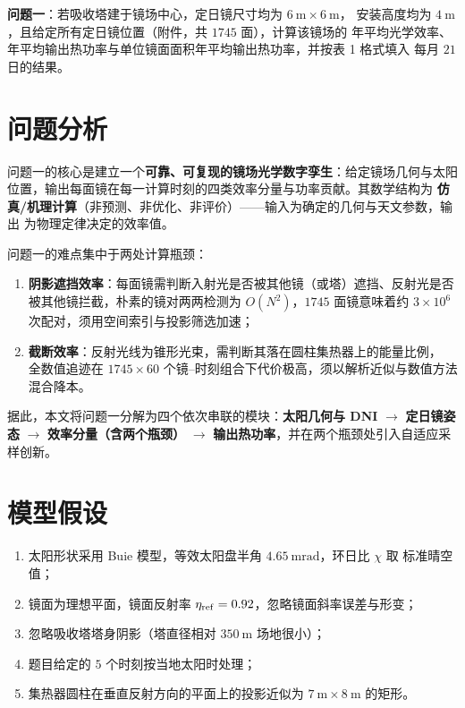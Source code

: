 \documentclass[12pt,a4paper]{ctexart}
\begin{document}
\textbf{问题一}：若吸收塔建于镜场中心，定日镜尺寸均为 $6\ \text{m}\times 6\ \text{m}$，
安装高度均为 $4\ \text{m}$，且给定所有定日镜位置（附件，共 $1745$ 面），计算该镜场的
年平均光学效率、年平均输出热功率与单位镜面面积年平均输出热功率，并按表 1 格式填入
每月 $21$ 日的结果。

\section{问题分析}
问题一的核心是建立一个\textbf{可靠、可复现的镜场光学数字孪生}：给定镜场几何与太阳
位置，输出每面镜在每一计算时刻的四类效率分量与功率贡献。其数学结构为
\textbf{仿真/机理计算}（非预测、非优化、非评价）——输入为确定的几何与天文参数，输出
为物理定律决定的效率值。

问题一的难点集中于两处计算瓶颈：
\begin{enumerate}
  \item \textbf{阴影遮挡效率}：每面镜需判断入射光是否被其他镜（或塔）遮挡、反射光是否
        被其他镜拦截，朴素的镜对两两检测为 $O(N^2)$，$1745$ 面镜意味着约 $3\times 10^6$
        次配对，须用空间索引与投影筛选加速；
  \item \textbf{截断效率}：反射光线为锥形光束，需判断其落在圆柱集热器上的能量比例，
        全数值追迹在 $1745\times 60$ 个镜--时刻组合下代价极高，须以解析近似与数值方法
        混合降本。
\end{enumerate}
据此，本文将问题一分解为四个依次串联的模块：\textbf{太阳几何与 DNI}
$\to$ \textbf{定日镜姿态} $\to$ \textbf{效率分量（含两个瓶颈）} $\to$
\textbf{输出热功率}，并在两个瓶颈处引入自适应采样创新。

\section{模型假设}
\begin{enumerate}
  \item 太阳形状采用 Buie 模型，等效太阳盘半角 $4.65\ \text{mrad}$，环日比 $\chi$ 取
        标准晴空值；
  \item 镜面为理想平面，镜面反射率 $\eta_{\rm ref}=0.92$，忽略镜面斜率误差与形变；
  \item 忽略吸收塔塔身阴影（塔直径相对 $350\ \text{m}$ 场地很小）；
  \item 题目给定的 $5$ 个时刻按当地太阳时处理；
  \item 集热器圆柱在垂直反射方向的平面上的投影近似为 $7\ \text{m}\times 8\ \text{m}$
        的矩形。
\end{enumerate}
\end{document}
